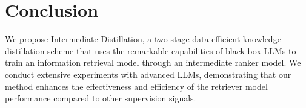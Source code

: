 \section{Conclusion}
We propose Intermediate Distillation, a two-stage data-efficient knowledge distillation scheme that uses the remarkable capabilities of black-box LLMs to train an information retrieval model through an intermediate ranker model.
We conduct extensive experiments with advanced LLMs, demonstrating that our method enhances the effectiveness and efficiency of the retriever model performance compared to other supervision signals. 